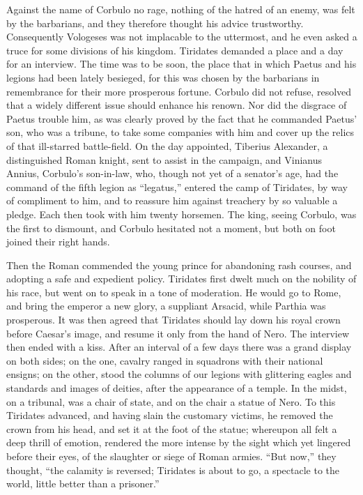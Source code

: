 Against the name of Corbulo no rage, nothing of the hatred of an enemy, was felt by the barbarians, and they therefore thought his advice trustworthy. Consequently Vologeses was not implacable to the uttermost, and he even asked a truce for some divisions of his kingdom. Tiridates demanded a place and a day for an interview. The time was to be soon, the place that in which Paetus and his legions had been lately besieged, for this was chosen by the barbarians in remembrance for their more prosperous fortune. Corbulo did not refuse, resolved that a widely different issue should enhance his renown. Nor did the disgrace of Paetus trouble him, as was clearly proved by the fact that he commanded Paetus' son, who was a tribune, to take some companies with him and cover up the relics of that ill-starred battle-field. On the day appointed, Tiberius Alexander, a distinguished Roman knight, sent to assist in the campaign, and Vinianus Annius, Corbulo's son-in-law, who, though not yet of a senator's age, had the command of the fifth legion as ``legatus,'' entered the camp of Tiridates, by way of compliment to him, and to reassure him against treachery by so valuable a pledge. Each then took with him twenty horsemen. The king, seeing Corbulo, was the first to dismount, and Corbulo hesitated not a moment, but both on foot joined their right hands.


Then the Roman commended the young prince for abandoning rash courses, and adopting a safe and expedient policy. Tiridates first dwelt much on the nobility of his race, but went on to speak in a tone of moderation. He would go to Rome, and bring the emperor a new glory, a suppliant Arsacid, while Parthia was prosperous. It was then agreed that Tiridates should lay down his royal crown before Caesar's image, and resume it only from the hand of Nero. The interview then ended with a kiss. After an interval of a few days there was a grand display on both sides; on the one, cavalry ranged in squadrons with their national ensigns; on the other, stood the columns of our legions with glittering eagles and standards and images of deities, after the appearance of a temple. In the midst, on a tribunal, was a chair of state, and on the chair a statue of Nero. To this Tiridates advanced, and having slain the customary victims, he removed the crown from his head, and set it at the foot of the statue; whereupon all felt a deep thrill of emotion, rendered the more intense by the sight which yet lingered before their eyes, of the slaughter or siege of Roman armies. ``But now,'' they thought, ``the calamity is reversed; Tiridates is about to go, a spectacle to the world, little better than a prisoner.''

